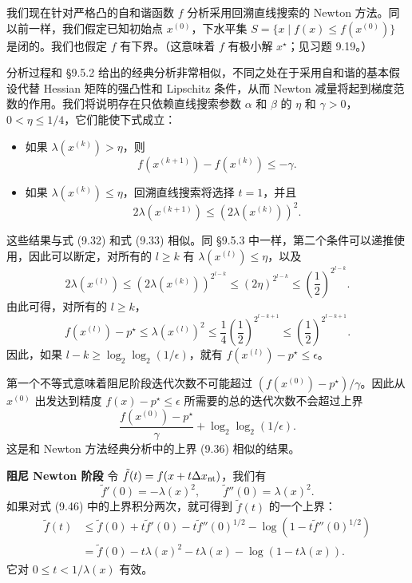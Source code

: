\documentclass[UTF8,12pt,a4paper,fontset=fandol]{ctexart}
\begin{document}
我们现在针对严格凸的自和谐函数 $f$ 分析采用回溯直线搜索的 Newton 方法。同以前一样，我们假定已知初始点 $x^{(0)}$，下水平集 $S=\{x\mid f(x)\leq f(x^{(0)})\}$ 是闭的。我们也假定 $f$ 有下界。（这意味着 $f$ 有极小解 $x^\star$；见习题 9.19。）

分析过程和 \S9.5.2 给出的经典分析非常相似，不同之处在于采用自和谐的基本假设代替 Hessian 矩阵的强凸性和 Lipschitz 条件，从而 Newton 减量将起到梯度范数的作用。我们将说明存在只依赖直线搜索参数 $\alpha$ 和 $\beta$ 的 $\eta$ 和 $\gamma>0$，$0<\eta\leq1/4$，它们能使下式成立：
\begin{itemize}
\item 如果 $\lambda(x^{(k)})>\eta$，则
\begin{equation}
f(x^{(k+1)})-f(x^{(k)})\leq-\gamma.
\tag{9.51}
\end{equation}
\item 如果 $\lambda(x^{(k)})\leq\eta$，回溯直线搜索将选择 $t=1$，并且
\begin{equation}
2\lambda(x^{(k+1)})\leq \left(2\lambda(x^{(k)})\right)^2.
\tag{9.52}
\end{equation}
\end{itemize}
这些结果与式 (9.32) 和式 (9.33) 相似。同 \S9.5.3 中一样，第二个条件可以递推使用，因此可以断定，对所有的 $l\geq k$ 有 $\lambda(x^{(l)})\leq\eta$，以及
\[
2\lambda(x^{(l)})\leq \left(2\lambda(x^{(k)})\right)^{2^{l-k}}
\leq (2\eta)^{2^{l-k}}\leq \left(\frac{1}{2}\right)^{2^{l-k}}.
\]
由此可得，对所有的 $l\geq k$，
\[
f(x^{(l)})-p^\star\leq \lambda(x^{(l)})^2
\leq \frac{1}{4}\left(\frac{1}{2}\right)^{2^{l-k+1}}
\leq \left(\frac{1}{2}\right)^{2^{l-k+1}}.
\]
因此，如果 $l-k\geq\log_2\log_2(1/\epsilon)$，就有 $f(x^{(l)})-p^\star\leq\epsilon$。

第一个不等式意味着阻尼阶段迭代次数不可能超过 $(f(x^{(0)})-p^\star)/\gamma$。因此从 $x^{(0)}$ 出发达到精度 $f(x)-p^\star\leq\epsilon$ 所需要的总的迭代次数不会超过上界
\begin{equation}
\frac{f(x^{(0)})-p^\star}{\gamma}+\log_2\log_2(1/\epsilon).
\tag{9.53}
\end{equation}
这是和 Newton 方法经典分析中的上界 (9.36) 相似的结果。

\noindent\textbf{阻尼 Newton 阶段}\quad
令 $\tilde{f}(t)=f(x+t\Delta x_{\rm nt})$，我们有
\[
\tilde{f}'(0)=-\lambda(x)^2,\qquad \tilde{f}''(0)=\lambda(x)^2.
\]
如果对式 (9.46) 中的上界积分两次，就可得到 $\tilde{f}(t)$ 的一个上界：
\begin{equation}
\begin{aligned}
\tilde{f}(t)
&\leq \tilde{f}(0)+t\tilde{f}'(0)-t\tilde{f}''(0)^{1/2}
-\log\left(1-t\tilde{f}''(0)^{1/2}\right)\\
&=\tilde{f}(0)-t\lambda(x)^2-t\lambda(x)-\log(1-t\lambda(x)).
\end{aligned}
\tag{9.54}
\end{equation}
它对 $0\leq t<1/\lambda(x)$ 有效。
\end{document}
